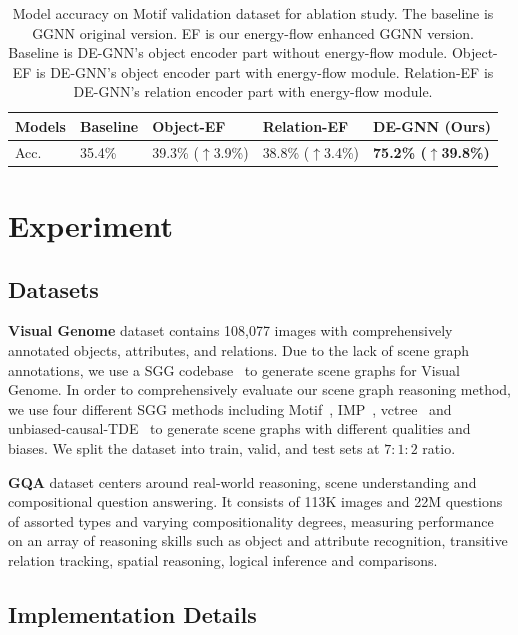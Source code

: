 \documentclass[letterpaper]{article} %
\begin{document}
\begin{table}
\centering
    \begin{tabular}{lllll}
    \hline
    \textbf{Models}&\textbf{Baseline} & \textbf{Object-EF}&\textbf{Relation-EF}&\textbf{DE-GNN (Ours)}\\
    \hline
     Acc. & 35.4\% & 39.3\% ($\uparrow$3.9\%) & 38.8\% ($\uparrow$3.4\%) & \textbf{75.2\% ($\uparrow$39.8\%)}  \\
    \hline
    \end{tabular}
\caption{\label{ablation-accuracy}
 Model accuracy on Motif validation dataset for ablation study. The baseline is GGNN original version. EF is our energy-flow enhanced GGNN version. Baseline is DE-GNN's object encoder part without energy-flow module. Object-EF is DE-GNN's object encoder part with energy-flow module. Relation-EF is DE-GNN's relation encoder part with energy-flow module.
}
\end{table}

\section{Experiment}
\subsection{Datasets}

\textbf{Visual Genome} dataset contains 108,077 images with comprehensively annotated objects, attributes, and relations. Due to the lack of scene graph annotations, we use a SGG codebase~\cite{tang2020sggcode} to generate scene graphs for Visual Genome. In order to comprehensively evaluate our scene graph reasoning method, we use four different SGG methods including Motif~\cite{DBLP:conf/cvpr/ZellersYTC18}, IMP~\cite{DBLP:conf/cvpr/XuZCF17},  vctree~\cite{DBLP:conf/cvpr/TangZWLL19} and unbiased-causal-TDE~\cite{DBLP:conf/cvpr/TangNHSZ20} to generate scene graphs with different qualities and biases. We split the dataset into train, valid, and test sets at $7:1:2$ ratio.

\textbf{GQA} dataset centers around real-world reasoning, scene understanding and compositional question answering. It consists of 113K images and 22M questions of assorted types and varying compositionality degrees, measuring performance on an array of reasoning skills such as object and attribute recognition, transitive relation tracking, spatial reasoning, logical inference and comparisons.

\subsection{Implementation Details}
\end{document}
